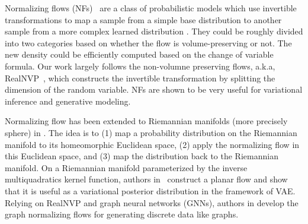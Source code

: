 { 
Normalizing flows (NFs)~\cite{rezende2015variational,dinh2016density} are a class of probabilistic models which use invertible transformations to map a sample from a simple base distribution to another sample from a more complex learned distribution \cite{papamakarios2019normalizing,kobyzev2019normalizing}.
They could be roughly divided into two categories based on whether the flow is volume-preserving or not.
The new density could be efficiently computed based on the change of variable formula.
Our work largely follows the non-volumne preserving flows, a.k.a, RealNVP~\cite{dinh2016density}, which constructs the invertible transformation by splitting the dimension of the random variable.
NFs are shown to be very useful for variational inference and generative modeling.

Normalizing flow has been extended to Riemannian manifolds (more precisely sphere) in \cite{gemici2016normalizing}. 
The idea is to (1) map a probability distribution on the Riemannian manifold to its homeomorphic Euclidean space, (2) apply the normalizing flow in this Euclidean space, and (3) map the distribution back to the Riemannian manifold.  
On a Riemannian manifold parameterized by the inverse multiquadratics kernel function, authors in~\cite{wang-wang-2019-riemannian} construct a planar flow and show that it is useful as a variational posterior distribution in the framework of VAE.
Relying on RealNVP and graph neural networks (GNNs), authors in \cite{liu2019graph} develop the graph normalizing flows for generating discrete data like graphs.
}


